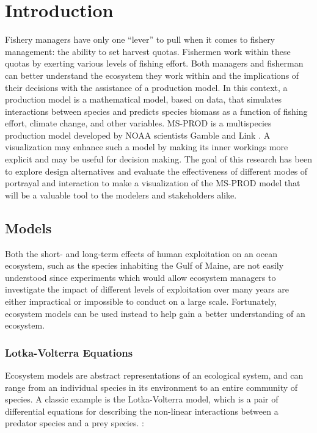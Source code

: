 %

\chapter{Introduction}                %

Fishery managers have only one ``lever'' to pull when it comes to fishery management: the ability to set harvest quotas.  Fishermen work within these quotas by exerting various levels of fishing effort.  Both managers and fisherman can better understand the ecosystem they work within and the implications of their decisions with the assistance of a production model.  In this context, a production model is a mathematical model, based on data, that simulates interactions between species and predicts species biomass as a function of fishing effort, climate change, and other variables.  MS-PROD is a multispecies production model developed by NOAA scientists Gamble and Link \cite{gamble2009}.  A visualization may enhance such a model by making its inner workings more explicit and may be useful for decision making. The goal of this research has been to explore design alternatives and evaluate the effectiveness of different modes of portrayal and interaction to make a visualization of the MS-PROD model that will be a valuable tool to the modelers and stakeholders alike. 

\section{Models}

Both the short- and long-term effects of human exploitation on an ocean ecosystem, such as the species inhabiting the Gulf of Maine, are not easily understood since experiments which would allow ecosystem managers to investigate the impact of different levels of exploitation over many years are either impractical or impossible to conduct on a large scale.  Fortunately, ecosystem models can be used instead to help gain a better understanding of an ecosystem.

\subsection{Lotka-Volterra Equations}

Ecosystem models are abstract representations of an ecological system, and can range from an individual species in its environment to an entire community of species.  A classic example is the Lotka-Volterra model, which is a pair of differential equations for describing the non-linear interactions between a predator species and a prey species. \cite{lotka1926, volterra1926}:

